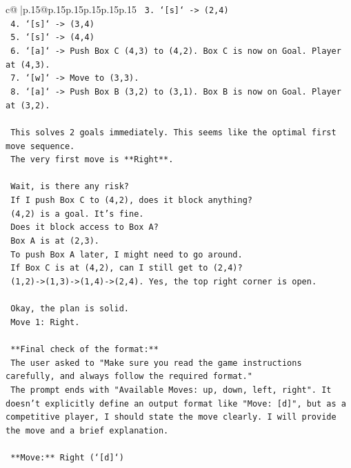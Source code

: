 \documentclass{article}
\begin{document}
{\begin{supertabular}{c@{$\;$}|p{.15\linewidth}@{}p{.15\linewidth}p{.15\linewidth}p{.15\linewidth}p{.15\linewidth}p{.15\linewidth}}
{{{\texttt{    3. `{[}s{]}` {-}> (2,4)} \\
\texttt{    4. `{[}s{]}` {-}> (3,4)} \\
\texttt{    5. `{[}s{]}` {-}> (4,4)} \\
\texttt{    6. `{[}a{]}` {-}> Push Box C (4,3) to (4,2). Box C is now on Goal. Player at (4,3).} \\
\texttt{    7. `{[}w{]}` {-}> Move to (3,3).} \\
\texttt{    8. `{[}a{]}` {-}> Push Box B (3,2) to (3,1). Box B is now on Goal. Player at (3,2).} \\
\\ 
\texttt{    This solves 2 goals immediately. This seems like the optimal first move sequence.} \\
\texttt{    The very first move is **Right**.} \\
\\ 
\texttt{    Wait, is there any risk?} \\
\texttt{    If I push Box C to (4,2), does it block anything?} \\
\texttt{    (4,2) is a goal. It's fine.} \\
\texttt{    Does it block access to Box A?} \\
\texttt{    Box A is at (2,3).} \\
\texttt{    To push Box A later, I might need to go around.} \\
\texttt{    If Box C is at (4,2), can I still get to (2,4)?} \\
\texttt{    (1,2){-}>(1,3){-}>(1,4){-}>(2,4). Yes, the top right corner is open.} \\
\\ 
\texttt{    Okay, the plan is solid.} \\
\texttt{    Move 1: Right.} \\
\\ 
\texttt{    **Final check of the format:**} \\
\texttt{    The user asked to "Make sure you read the game instructions carefully, and always follow the required format."} \\
\texttt{    The prompt ends with "Available Moves: up, down, left, right". It doesn't explicitly define an output format like "Move: {[}d{]}", but as a competitive player, I should state the move clearly. I will provide the move and a brief explanation.} \\
\\ 
\texttt{    **Move:** Right (`{[}d{]}`)} \\
}}}
\end{supertabular}}
\end{document}
